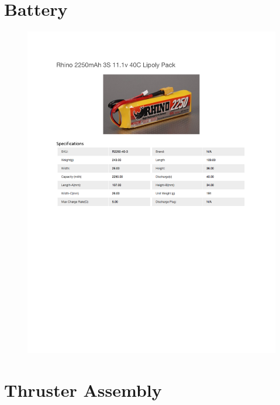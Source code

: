 \documentclass[../main.tex]{subfiles}
\begin{document}
\section{Battery \cite{BATTERY}} \label{Battery} \label{BATTERY}
\begin{figure}[H]
	\centering
	\includegraphics[width=\textwidth]{img/specs/battery_2250.pdf}
\end{figure}

\section{Thruster Assembly} \label{Thruster}

\end{document}
